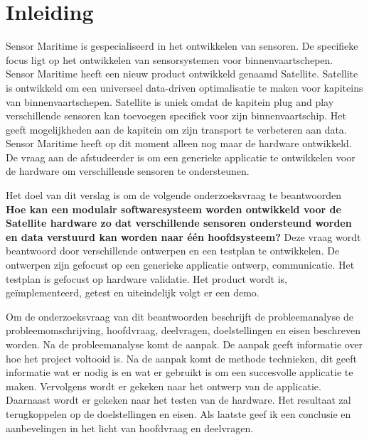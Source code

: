 \chapter{Inleiding}
Sensor Maritime is gespecialiseerd in het ontwikkelen van sensoren. De specifieke focus ligt op het ontwikkelen van sensorsystemen voor binnenvaartschepen. Sensor Maritime heeft een nieuw product ontwikkeld genaamd Satellite. Satellite is ontwikkeld om een universeel data-driven optimalisatie te maken voor kapiteins van binnenvaartschepen. Satellite is uniek omdat de kapitein plug and play verschillende sensoren kan toevoegen specifiek voor zijn binnenvaartschip. Het geeft mogelijkheden aan de kapitein om zijn transport te verbeteren aan data. Sensor Maritime heeft op dit moment alleen nog maar de hardware ontwikkeld. De vraag aan de afstudeerder is om een generieke applicatie te ontwikkelen voor de hardware om verschillende sensoren te ondersteunen.\newline

\noindent Het doel van dit verslag is om de volgende onderzoeksvraag te beantwoorden \textbf{Hoe kan een modulair softwaresysteem worden ontwikkeld voor de Satellite hardware zo dat verschillende sensoren ondersteund worden en data verstuurd kan worden naar één hoofdsysteem?} Deze vraag wordt beantwoord door verschillende ontwerpen en een testplan te ontwikkelen. De ontwerpen zijn gefocust op een generieke applicatie ontwerp, communicatie. Het testplan is gefocust op hardware validatie. Het product wordt is, geïmplementeerd, getest en uiteindelijk volgt er een demo. \newline

\noindent Om de onderzoeksvraag van dit beantwoorden beschrijft de probleemanalyse de probleemomschrijving, hoofdvraag, deelvragen, doelstellingen en eisen beschreven worden. Na de probleemanalyse komt de aanpak. De aanpak geeft informatie over hoe het project voltooid is. Na de aanpak komt de methode technieken, dit geeft informatie wat er nodig is en wat er gebruikt is om een succesvolle applicatie te maken. Vervolgens wordt er gekeken naar het ontwerp van de applicatie. Daarnaast wordt er gekeken naar het testen van de hardware. Het resultaat zal terugkoppelen op de doelstellingen en eisen. Als laatste geef ik een conclusie en aanbevelingen in het licht van hoofdvraag en deelvragen.